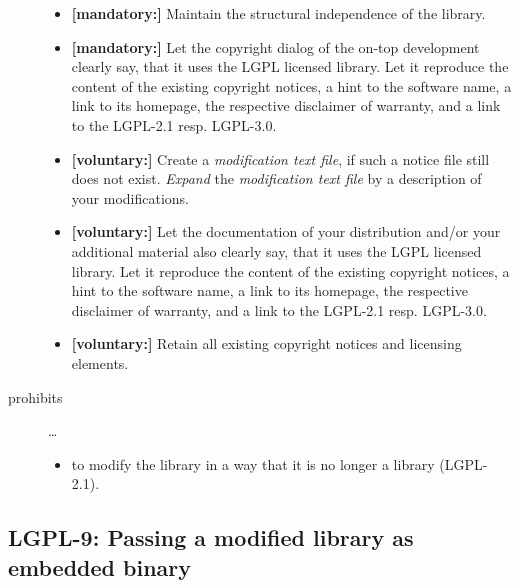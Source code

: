 \begin{description}
\begin{itemize}
  \item \textbf{[mandatory:]}  Maintain the structural independence of the
  library.
   
  \item \textbf{[mandatory:]} Let the copyright dialog of the on-top development
  clearly say, that it uses the LGPL licensed library. Let it reproduce the
  content of the existing copyright notices, a hint to the software name, a link
  to its homepage, the respective disclaimer of warranty, and a link to the
  LGPL-2.1 resp. LGPL-3.0.
     
  \item \textbf{[voluntary:]} Create a \emph{modification text file}, if such a
  notice file still does not exist. \emph{Expand} the \emph{modification text
  file} by a description of your modifications.
  
 \item \textbf{[voluntary:]} Let the documentation of your distribution and/or
  your additional material also clearly say, that it uses the LGPL licensed
  library. Let it reproduce the content of the existing copyright notices, a
  hint to the software name, a link to its homepage, the respective disclaimer
  of warranty, and a link to the LGPL-2.1 resp. LGPL-3.0.
  
  \item \textbf{[voluntary:]} Retain all existing copyright notices and
  licensing elements.
  
\end{itemize}

\item[prohibits] \ldots
\begin{itemize}
  \item to modify the library in a way that it is no longer a library
  (LGPL-2.1).
\end{itemize}

\end{description}


\subsection{LGPL-9: Passing a modified library as embedded binary}

